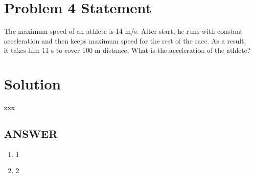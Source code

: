 \section*{Problem 4 Statement}

The maximum speed of an athlete is 14 m/s. After start, he runs with constant acceleration and
then keeps maximum speed for the rest of the race. As a result, it takes him 11 s to cover 100 m
distance. What is the acceleration of the athlete?



\section*{Solution}

xxx

\vfill
\subsection*{ANSWER}
\begin{enumerate}
    \item 1
    \item 2
\end{enumerate}